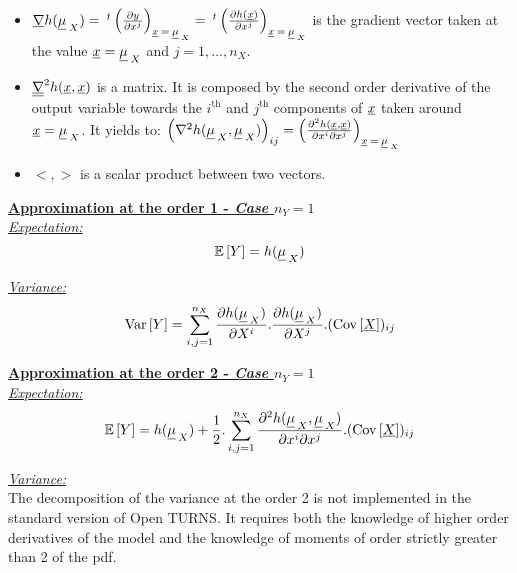 {\begin{itemize}
  \item $\underline{\nabla} h(\underline{\mu}_{\:X}) = \: ^t \left( \frac{\partial y}{\partial x^j}\right)_{\underline{x}\: =\: \underline{\mu}_{\:X}} = \: ^t \left( \frac{\partial h(\underline{x})}{\partial x^j}\right)_{\underline{x}\: =\: \underline{\mu}_{\:X}} $ is the gradient vector taken at the value $\underline{x} = \underline{\mu}_{\:X}$ and $j=1,\ldots,n_X$.

  \item $\underline{\underline{\nabla}}^2 h(\underline{x},\underline{x})$ is a matrix. It is composed by the second order derivative of the output variable towards the $i^\textrm{th}$ and $j^\textrm{th}$ components of $\underline{x}$ taken around $\underline{x} = \underline{\mu}_{\:X}$. It yields to: $\left( \nabla^2 h(\underline{\mu}_{\:X},\underline{\mu}_{\:X}) \right)_{ij} =\left( \frac{\partial^2 h(\underline{x},\underline{x})}{\partial x^i \partial x^j}\right)_{\underline{x}\: =\: \underline{\mu}_{\:X}}$
  \item $<,>$ is a scalar product between two vectors.

  \end{itemize}

  \underline{\textbf{Approximation at the order 1 - \textit{Case $n_Y = 1$}}}\\

  \underline{\textit{Expectation:}}\\

  $$
  {\mathbb E}\left[ Y \right] = h(\underline{\mu}_{\:X})
  $$

  \underline{\textit{Variance:}}\\

  $$
  {\rm Var}\left[ Y \right] = \sum_{i,j=1}^{n_X} \frac{\partial h(\underline{\mu}_{\:X})}{\partial X^i} . \frac{\partial h(\underline{\mu}_{\:X})}{\partial X^j}.({\rm Cov}\left[ \underline{X} \right])_{ij}
  $$

  \underline{\textbf{Approximation at the order 2 - \textit{Case $n_Y = 1$}}}\\

  \underline{\textit{Expectation:}}\\
  \begin{eqnarray*}
    \begin{split}
      {\mathbb E}\left[ Y \right] = h(\underline{\mu}_{\:X}) + \frac{1}{2}. \sum_{i,j=1}^{n_X} \frac{\partial^2 h(\underline{\mu}_{\:X},\underline{\mu}_{\:X})}{\partial x^i \partial x^j} . ({\rm Cov}\left[ \underline{X} \right])_{ij}
    \end{split}
  \end{eqnarray*}

  \underline{\textit{Variance:}}\\
  The decomposition of the variance at the order 2 is not implemented in the standard version of Open TURNS. It requires both the knowledge of higher order derivatives of the model and the knowledge of moments of order strictly greater than 2 of the pdf.\\


}
